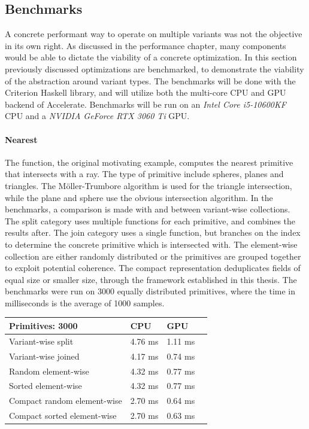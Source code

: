 \documentclass{article}
\newcommand{\type}[1]{\smash{\colorbox{codegray}{\texttt{#1}}}}
\begin{document}
\newpage

\subsection{Benchmarks}

A concrete performant way to operate on multiple variants was not the objective in its own right.
As discussed in the performance chapter, many components would be able to dictate the viability of a concrete optimization. 
In this section previously discussed optimizations are benchmarked, to demonstrate the viability of the abstraction around variant types.
The benchmarks will be done with the Criterion Haskell library, and will utilize both the multi-core CPU and GPU backend of Accelerate.
Benchmarks will be run on an {\it Intel Core i5-10600KF} CPU and a {\it NVIDIA GeForce RTX 3060 Ti} GPU.

\paragraph{Nearest}

The \type{nearest} function, the original motivating example, computes the nearest primitive that intersects with a ray.
The type of primitive include spheres, planes and triangles.
The Möller-Trumbore algorithm is used for the triangle intersection, while the plane and sphere use the obvious intersection algorithm.
In the benchmarks, a comparison is made with and between variant-wise collections.
The split category uses multiple functions for each primitive, and combines the results after.
The join category uses a single function, but branches on the index to determine the concrete primitive which is intersected with.
The element-wise collection are either randomly distributed or the primitives are grouped together to exploit potential coherence.
The compact representation deduplicates fields of equal size or smaller size, through the framework established in this thesis.
The benchmarks were run on 3000 equally distributed primitives, where the time in milliseconds is the average of 1000 samples.

\begin{center}
    \begin{tabular}{ | m{14em} | m{8em}| m{8em} | m{8em} | } 
      \hline
      {\bf Primitives: 3000} & {\bf CPU} & {\bf GPU} \\ 
      \hline
      Variant-wise split          & 4.76 ms & 1.11 ms\\ 
      \hline
      Variant-wise joined         & 4.17 ms & 0.74 ms\\ 
      \hline
      Random element-wise         & 4.32 ms & 0.77 ms\\ 
      \hline
      Sorted element-wise         & 4.32 ms & 0.77 ms\\ 
      \hline
      Compact random element-wise & 2.70 ms & 0.64 ms\\ 
      \hline
      Compact sorted element-wise & 2.70 ms & 0.63 ms\\ 
      \hline
    \end{tabular}
\end{center}
\end{document}

